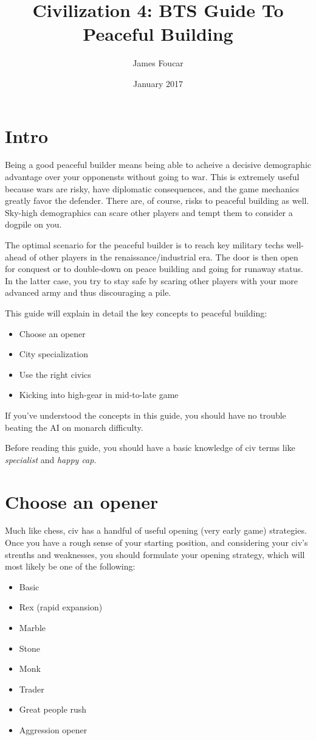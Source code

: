 \documentclass[10pt]{article}
\title{Civilization 4: BTS Guide To Peaceful Building}
\author{James Foucar}
\date{January 2017}
\begin{document}
\section*{Intro}

Being a good peaceful builder means being able to acheive a decisive demographic advantage
over your opponensts without going to war. This is extremely useful because wars are risky, have
diplomatic consequences, and the game mechanics greatly favor the defender. There are, of course,
risks to peaceful building as well. Sky-high demographics can scare other players and tempt them
to consider a dogpile on you.

The optimal scenario for the peaceful builder is to reach key military
techs well-ahead of other players in the renaissance/industrial era. The door is then open for conquest
or to double-down on peace building and going for runaway status. In the latter case, you try to stay
safe by scaring other players with your more advanced army and thus discouraging a pile.

This guide will explain in detail the key concepts to peaceful building:
\begin{itemize}
\item Choose an opener
\item City specialization
\item Use the right civics
\item Kicking into high-gear in mid-to-late game
\end{itemize}

If you've understood the concepts in this guide, you should have no trouble beating the AI
on monarch difficulty.

Before reading this guide, you should have a basic knowledge of civ terms like \emph{specialist}
and \emph{happy cap}.

\section*{Choose an opener}

Much like chess, civ has a handful of useful opening (very early game) strategies. Once you
have a rough sense of your starting position, and considering your civ's strenths and weaknesses,
you should formulate your opening strategy, which will most likely be one of the following:
\begin{itemize}
\item Basic
\item Rex (rapid expansion)
\item Marble
\item Stone
\item Monk
\item Trader
\item Great people rush
\item Aggression opener
\end{itemize}
\end{document}
